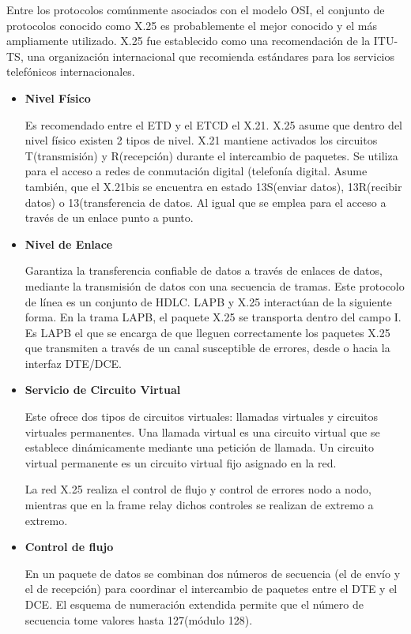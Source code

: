 \documentclass[a4paper,12pt]{article}
\begin{document}
Entre los protocolos comúnmente asociados con el modelo OSI, el conjunto de protocolos conocido
como X.25 es probablemente el mejor conocido y el más ampliamente utilizado. X.25 fue establecido como
una recomendación de la ITU-TS, una organización internacional que recomienda estándares
para los servicios telefónicos internacionales.

\begin{itemize}
 \item \textbf{Nivel Físico}
 
 Es recomendado entre el ETD y el ETCD el X.21. X.25 asume que dentro del nivel físico existen 2 tipos de nivel.
 X.21 mantiene activados los circuitos T(transmisión) y R(recepción) durante el intercambio de paquetes. Se utiliza
 para el acceso a redes de conmutación digital (telefonía digital. Asume también, que el X.21bis se encuentra
 en estado 13S(enviar datos), 13R(recibir datos) o 13(transferencia de datos. Al igual que se emplea para el 
 acceso a través de un enlace punto a punto.
 
 \item \textbf{Nivel de Enlace}
 
 Garantiza la transferencia confiable de datos a través de enlaces de datos, mediante la transmisión de datos
 con una secuencia de tramas. Este protocolo de línea es un conjunto de HDLC. LAPB y X.25 interactúan de la siguiente forma.
 En la trama LAPB, el paquete X.25 se transporta dentro del campo I. Es LAPB el que se encarga de que lleguen correctamente
 los paquetes X.25 que transmiten a través de un canal susceptible de errores, desde o hacia la interfaz DTE/DCE.
 
 \item \textbf{Servicio de Circuito Virtual}
 
 Este ofrece dos tipos de circuitos virtuales: llamadas virtuales y circuitos virtuales permanentes. Una llamada virtual es una circuito virtual
 que se establece dinámicamente mediante una petición de llamada. Un circuito virtual permanente es un circuito virtual fijo asignado en la red.
 
 La red X.25 realiza el control de flujo y control de errores nodo a nodo, mientras que en la frame relay dichos
 controles se realizan de extremo a extremo.
 
 \item \textbf{Control de flujo}
 
 En un paquete de datos se combinan dos números de secuencia (el de envío y el de recepción) para coordinar el intercambio de paquetes entre el DTE y el DCE.
 El esquema de numeración extendida permite que el número de secuencia tome valores hasta 127(módulo 128).
 

\end{itemize}
\end{document}
